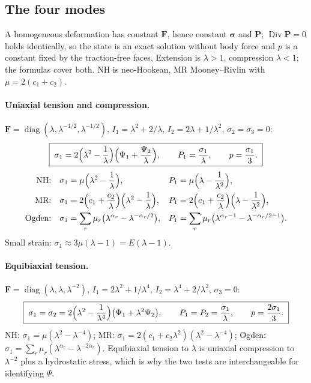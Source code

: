 \documentclass[11pt]{article}
\newcommand{\Dive}{\operatorname{Div}}
\newcommand{\diag}{\operatorname{diag}}
\newcommand{\bsig}{\bm{\sigma}}
\newcommand{\bP}{\bm{P}}
\newcommand{\bF}{\bm{F}}
\newcommand{\Pone}{\Psi_{1}}
\newcommand{\Ptwo}{\Psi_{2}}
\newcommand{\Ione}{I_1}
\newcommand{\Itwo}{I_2}
\begin{document}
\subsection{The four modes}

A homogeneous deformation has constant $\bF$, hence constant $\bsig$ and
$\bP$; $\Dive\bP = 0$ holds identically, so the state is an exact solution
without body force and $p$ is a constant fixed by the traction-free faces.
Extension is $\lambda > 1$, compression $\lambda < 1$; the formulas cover
both.  NH is neo-Hookean, MR Mooney--Rivlin with $\mu = 2(c_1 + c_2)$.

\paragraph{Uniaxial tension and compression.}
$\bF = \diag(\lambda, \lambda^{-1/2}, \lambda^{-1/2})$,
$\Ione = \lambda^2 + 2/\lambda$, $\Itwo = 2\lambda + 1/\lambda^2$,
$\sigma_2 = \sigma_3 = 0$:
\begin{equation}
  \boxed{\;
  \sigma_1 = 2\Bigl(\lambda^2 - \frac1\lambda\Bigr)\Bigl(\Pone + \frac{\Ptwo}{\lambda}\Bigr),
  \qquad
  P_1 = \frac{\sigma_1}{\lambda},
  \qquad
  p = \frac{\sigma_1}{3}.\;}
\end{equation}
\begin{align}
  \text{NH:}\quad & \sigma_1 = \mu\Bigl(\lambda^2 - \frac1\lambda\Bigr), &
  P_1 &= \mu\Bigl(\lambda - \frac1{\lambda^2}\Bigr), \\
  \text{MR:}\quad & \sigma_1 = 2\Bigl(c_1 + \frac{c_2}{\lambda}\Bigr)\Bigl(\lambda^2 - \frac1\lambda\Bigr), &
  P_1 &= 2\Bigl(c_1 + \frac{c_2}{\lambda}\Bigr)\Bigl(\lambda - \frac1{\lambda^2}\Bigr), \\
  \text{Ogden:}\quad & \sigma_1 = \sum_r\mu_r\bigl(\lambda^{\alpha_r} - \lambda^{-\alpha_r/2}\bigr), &
  P_1 &= \sum_r\mu_r\bigl(\lambda^{\alpha_r-1} - \lambda^{-\alpha_r/2-1}\bigr).
\end{align}
Small strain: $\sigma_1 \approx 3\mu(\lambda - 1) = E(\lambda - 1)$.

\paragraph{Equibiaxial tension.}
$\bF = \diag(\lambda, \lambda, \lambda^{-2})$,
$\Ione = 2\lambda^2 + 1/\lambda^4$, $\Itwo = \lambda^4 + 2/\lambda^2$,
$\sigma_3 = 0$:
\begin{equation}
  \boxed{\;
  \sigma_1 = \sigma_2 = 2\Bigl(\lambda^2 - \frac1{\lambda^4}\Bigr)\bigl(\Pone + \lambda^2\Ptwo\bigr),
  \qquad
  P_1 = P_2 = \frac{\sigma_1}{\lambda},
  \qquad
  p = \frac{2\sigma_1}{3}.\;}
\end{equation}
NH: $\sigma_1 = \mu(\lambda^2 - \lambda^{-4})$; MR:
$\sigma_1 = 2(c_1 + c_2\lambda^2)(\lambda^2 - \lambda^{-4})$; Ogden:
$\sigma_1 = \sum_r\mu_r(\lambda^{\alpha_r} - \lambda^{-2\alpha_r})$.
Equibiaxial tension to $\lambda$ is uniaxial compression to $\lambda^{-2}$
plus a hydrostatic stress, which is why the two tests are interchangeable
for identifying $\Psi$.
\end{document}
